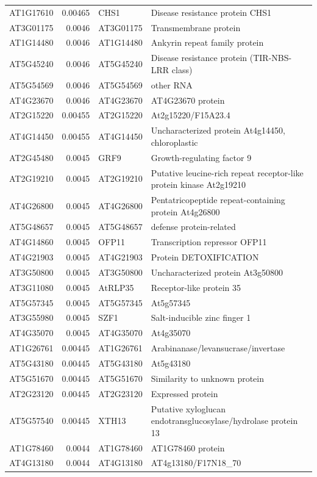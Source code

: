 \documentclass[11pt]{article}
\begin{document}
\begin{center}
\begin{tabular}{lrll}
AT1G17610 & 0.00465 & CHS1 & Disease resistance protein CHS1\\
AT3G01175 & 0.0046 & AT3G01175 & Transmembrane protein\\
AT1G14480 & 0.0046 & AT1G14480 & Ankyrin repeat family protein\\
AT5G45240 & 0.0046 & AT5G45240 & Disease resistance protein (TIR-NBS-LRR class)\\
AT5G54569 & 0.0046 & AT5G54569 & other RNA\\
AT4G23670 & 0.0046 & AT4G23670 & AT4G23670 protein\\
AT2G15220 & 0.00455 & AT2G15220 & At2g15220/F15A23.4\\
AT4G14450 & 0.00455 & AT4G14450 & Uncharacterized protein At4g14450, chloroplastic\\
AT2G45480 & 0.0045 & GRF9 & Growth-regulating factor 9\\
AT2G19210 & 0.0045 & AT2G19210 & Putative leucine-rich repeat receptor-like protein kinase At2g19210\\
AT4G26800 & 0.0045 & AT4G26800 & Pentatricopeptide repeat-containing protein At4g26800\\
AT5G48657 & 0.0045 & AT5G48657 & defense protein-related\\
AT4G14860 & 0.0045 & OFP11 & Transcription repressor OFP11\\
AT4G21903 & 0.0045 & AT4G21903 & Protein DETOXIFICATION\\
AT3G50800 & 0.0045 & AT3G50800 & Uncharacterized protein At3g50800\\
AT3G11080 & 0.0045 & AtRLP35 & Receptor-like protein 35\\
AT5G57345 & 0.0045 & AT5G57345 & At5g57345\\
AT3G55980 & 0.0045 & SZF1 & Salt-inducible zinc finger 1\\
AT4G35070 & 0.0045 & AT4G35070 & At4g35070\\
AT1G26761 & 0.00445 & AT1G26761 & Arabinanase/levansucrase/invertase\\
AT5G43180 & 0.00445 & AT5G43180 & At5g43180\\
AT5G51670 & 0.00445 & AT5G51670 & Similarity to unknown protein\\
AT2G23120 & 0.00445 & AT2G23120 & Expressed protein\\
AT5G57540 & 0.00445 & XTH13 & Putative xyloglucan endotransglucosylase/hydrolase protein 13\\
AT1G78460 & 0.0044 & AT1G78460 & AT1G78460 protein\\
AT4G13180 & 0.0044 & AT4G13180 & AT4g13180/F17N18\_70\\

\end{tabular}
\end{center}
\end{document}
